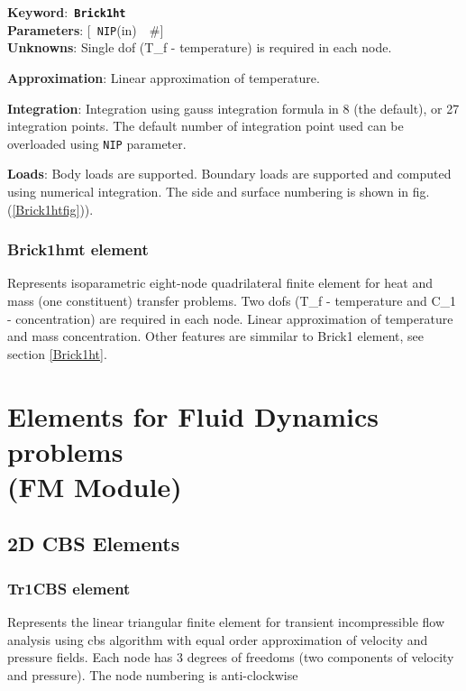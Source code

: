 \documentclass[a4paper]{article}
\newcommand{\descitem}[1]{{\noindent \bf #1}:}
\newcommand{\elemkeyword}[1]{\descitem{Keyword}~{\bf \texttt{#1}}}
\newcommand{\elemparam}[2]{{{\texttt{#1}\tiny (#2)}~~\#}}
\newcommand{\optelemparam}[2]{{[~\elemparam{#1}{#2}]}}
\newcommand{\param}[1]{{\texttt{#1}}}
\begin{document}
\elemkeyword{Brick1ht}\\
\descitem{Parameters} \optelemparam{NIP}{in}\\
\descitem{Unknowns}
Single dof (T\_f - temperature) is required in each node.

\descitem{Approximation} Linear approximation of temperature.

\descitem{Integration}
Integration using gauss integration formula
in 8 (the default), or 27 integration points. The default number of
integration point used can be overloaded using \param{NIP} parameter.

\descitem{Loads} Body loads are supported. Boundary loads are
supported and computed using numerical integration. The side and
surface numbering is shown in fig. (\ref{Brick1htfig})).

\subsubsection{Brick1hmt element}
Represents isoparametric eight-node quadrilateral finite element for
heat and mass (one constituent) transfer problems. 
Two dofs (T\_f - temperature and C\_1 - concentration) are required in
each node. Linear approximation of temperature and mass concentration.
Other features are simmilar to Brick1 element, see section \ref{Brick1ht}.

\section{Elements for Fluid Dynamics problems\\(FM Module)}
\subsection{2D CBS Elements}
\subsubsection{Tr1CBS element}
\label{Tr1CBS}
Represents the linear triangular finite element for transient
incompressible flow analysis using cbs algorithm with equal order
approximation of velocity and pressure fields. Each node has 3 degrees
of freedoms (two components of velocity and pressure).
The node numbering is anti-clockwise
\end{document}
